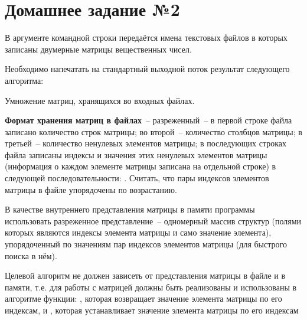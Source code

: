 \section*{Домашнее задание №2}

В аргументе командной строки передаётся имена текстовых файлов
в которых записаны двумерные матрицы
вещественных чисел.

Необходимо напечатать на стандартный выходной
поток результат следующего алгоритма:

Умножение матриц, хранящихся во входных файлах.

\textbf{Формат хранения матриц в файлах}~--
разреженный~-- в первой строке файла записано количество строк
матрицы; во второй~-- количество столбцов матрицы; в третьей~--
количество ненулевых элементов матрицы; в последующих строках
файла записаны индексы и значения этих ненулевых элементов
матрицы (информация о каждом элементе матрицы записана на
отдельной строке) в следующей последовательности: 
 . Считать, что пары индексов
элементов матрицы в файле упорядочены по возрастанию.

В качестве внутреннего представления матрицы в памяти программы
использовать разреженное представление~-- одномерный массив структур (полями
которых являются индексы элемента матрицы и само значение
элемента), упорядоченный по значениям пар индексов элементов
матрицы (для быстрого поиска в нём).

Целевой алгоритм не
должен зависеть от представления матрицы в файле и в памяти, т.е. для
работы с матрицей должны быть реализованы и использованы в алгоритме
функции: , которая возвращает
значение элемента матрицы по его индексам, и , которая устанавливает значение элемента
матрицы по его индексам
